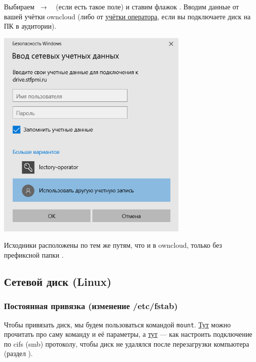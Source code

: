 Выбираем  \ $\rightarrow$ \  (если есть такое поле) и ставим флажок . Вводим данные от вашей учётки owncloud (либо от \hyperlink{lectory-operator-profile}{учётки оператора}, если вы подключаете диск на ПК в аудитории).

\begin{center}
  \begin{minipage}[c]{0.7\textwidth}
    \centering
    \includegraphics[width=0.7\textwidth,fbox]{Images/CloudStorage/windows/login.jpg}
  \end{minipage}
\end{center}

Исходники расположены по тем же путям, что и в owncloud, только без префиксной папки .

\subsection{Сетевой диск (Linux)}

\subsubsection{Постоянная привязка (изменение /etc/fstab)}

Чтобы привязать диск, мы будем пользоваться командой \texttt{mount}. \href{https://losst.pro/montirovanie-diska-v-linux}{Тут} можно прочитать про саму команду и её параметры, а \href{https://ubuntuforums.org/showthread.php?t=288534}{тут} --- как настроить подключение по cifs (smb) протоколу, чтобы диск не удалялся после перезагрузки компьютера (раздел ).

